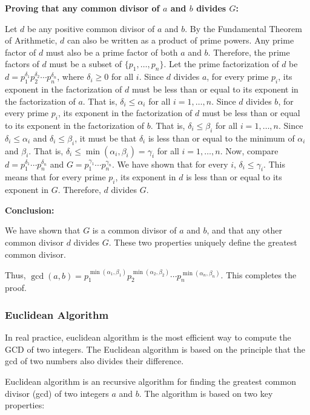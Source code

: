 \documentclass[oneside]{book}
\begin{document}
{\textbf{Proving that any common divisor of $a$ and $b$ divides $G$:}

Let $d$ be any positive common divisor of $a$ and $b$. By the Fundamental Theorem of Arithmetic, $d$ can also be written as a product of prime powers. Any prime factor of $d$ must also be a prime factor of both $a$ and $b$. Therefore, the prime factors of $d$ must be a subset of $\{p_1, \dots, p_n\}$.
Let the prime factorization of $d$ be $d = p_1^{\delta_1} p_2^{\delta_2} \cdots p_n^{\delta_n}$, where $\delta_i \ge 0$ for all $i$.
Since $d$ divides $a$, for every prime $p_i$, its exponent in the factorization of $d$ must be less than or equal to its exponent in the factorization of $a$. That is, $\delta_i \le \alpha_i$ for all $i = 1, \dots, n$.
Since $d$ divides $b$, for every prime $p_i$, its exponent in the factorization of $d$ must be less than or equal to its exponent in the factorization of $b$. That is, $\delta_i \le \beta_i$ for all $i = 1, \dots, n$.
Since $\delta_i \le \alpha_i$ and $\delta_i \le \beta_i$, it must be that $\delta_i$ is less than or equal to the minimum of $\alpha_i$ and $\beta_i$. That is, $\delta_i \le \min(\alpha_i, \beta_i) = \gamma_i$ for all $i = 1, \dots, n$.
Now, compare $d = p_1^{\delta_1} \cdots p_n^{\delta_n}$ and $G = p_1^{\gamma_1} \cdots p_n^{\gamma_n}$.
We have shown that for every $i$, $\delta_i \le \gamma_i$.
This means that for every prime $p_i$, its exponent in $d$ is less than or equal to its exponent in $G$.
Therefore, $d$ divides $G$.

\textbf{Conclusion:}

We have shown that $G$ is a common divisor of $a$ and $b$, and that any other common divisor $d$ divides $G$. These two properties uniquely define the greatest common divisor.

Thus, $\gcd(a, b) = p_1^{\min(\alpha_1, \beta_1)} p_2^{\min(\alpha_2, \beta_2)} \cdots p_n^{\min(\alpha_n, \beta_n)}$.
This completes the proof.
}


\subsubsection{Euclidean Algorithm}
In real practice, euclidean algorithm is the most efficient way to compute the GCD of two integers. The Euclidean algorithm is based on the principle that the gcd of two numbers also divides their difference.

Euclidean algorithm is an recursive algorithm for finding the greatest common divisor (gcd) of two integers \(a\) and \(b\). The algorithm is based on two key properties:
\end{document}
